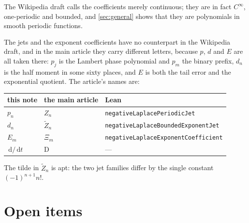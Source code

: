 \documentclass[11pt,oneside]{article}
\theoremstyle{definition}
\theoremstyle{remark}
\newcommand{\dd}{\,\mathrm d}
\begin{document}
The Wikipedia draft calls the coefficients merely continuous; they are in fact
$C^\infty$, one-periodic and bounded, and \cref{sec:general} shows that they are
polynomials in smooth periodic functions.

The jets and the exponent coefficients have no counterpart in the Wikipedia
draft, and in the main article they carry different letters, because $p$, $d$
and $E$ are all taken there: $p_j$ is the Lambert phase polynomial and $p_m$
the binary prefix, $d_n$ is the half moment in some sixty places, and $E$ is
both the tail error and the exponential quotient.  The article's names are:

\begin{center}
\begin{tabular}{@{}lll@{}}
\toprule
this note & the main article & Lean\\
\midrule
$p_n$ & $Z_n$ & \texttt{negativeLaplacePeriodicJet}\\
$d_n$ & $\widetilde Z_n$ & \texttt{negativeLaplaceBoundedExponentJet}\\
$E_m$ & $\Xi_m$ & \texttt{negativeLaplaceExponentCoefficient}\\
$\dd/\dd t$ & $\mathrm D$ & ---\\
\bottomrule
\end{tabular}
\end{center}

The tilde in $\widetilde Z_n$ is apt: the two jet families differ by the
single constant $(-1)^{n+1}n!$.

\section{Open items}\label{sec:open}
\end{document}
